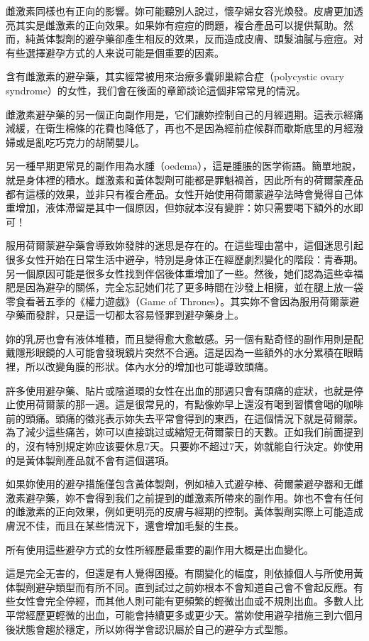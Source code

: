 \documentclass[12pt,UTF8]{ctexbook}
\begin{document}
雌激素同樣也有正向的影響。妳可能聽別人說过，懷孕婦女容光煥發。皮膚更加透亮其实是雌激素的正向效果。如果妳有痘痘的問題，複合產品可以提供幫助。然而，純黃体製劑的避孕藥卻產生相反的效果，反而造成皮膚、頭髮油膩与痘痘。对有些選擇避孕方式的人来说可能是個重要的因素。

含有雌激素的避孕藥，其实經常被用來治療多囊卵巢綜合症（polycystic ovary syndrome）的女性，我们會在後面的章節談论這個非常常見的情況。

雌激素避孕藥的另一個正向副作用是，它们讓妳控制自己的月經週期。這表示經痛減緩，在衛生棉條的花費也降低了，再也不是因為經前症候群而歇斯底里的月經潑婦或是亂吃巧克力的胡鬧嬰儿。

另一種早期更常見的副作用為水腫（oedema），這是腫脹的医学術語。簡單地說，就是身体裡的積水。雌激素和黃体製劑可能都是罪魁禍首，因此所有的荷爾蒙產品都有這樣的效果，並非只有複合產品。女性开始使用荷爾蒙避孕法時會覺得自己体重增加，液体滯留是其中一個原因，但妳就本沒有變胖：妳只需要喝下額外的水即可！

服用荷爾蒙避孕藥會導致妳發胖的迷思是存在的。在這些理由當中，這個迷思引起很多女性开始在日常生活中避孕，特別是身体正在經歷劇烈變化的階段：青春期。另一個原因可能是很多女性找到伴侶後体重增加了一些。然後，她们認為這些幸福肥是因為避孕的關係，完全忘記她们花了更多時間在沙發上相擁，並在腿上放一袋零食看著五季的《權力遊戲》（Game of Thrones）。其实妳不會因為服用荷爾蒙避孕藥而發胖，只是這一切都太容易怪罪到避孕藥身上。

妳的乳房也會有液体堆積，而且變得愈大愈敏感。另一個有點奇怪的副作用則是配戴隱形眼鏡的人可能會發現鏡片突然不合適。這是因為一些額外的水分累積在眼睛裡，所以改變角膜的形狀。体內水分的增加也可能導致頭痛。

許多使用避孕藥、貼片或陰道環的女性在出血的那週只會有頭痛的症狀，也就是停止使用荷爾蒙的那一週。這是很常見的，有點像妳早上還沒有喝到習慣會喝的咖啡前的頭痛。頭痛的徵兆表示妳失去平常會得到的東西，在這個情況下就是荷爾蒙。為了減少這些痛苦，妳可以直接跳过或縮短无荷爾蒙日的天數。正如我们前面提到的，沒有特別規定妳应该要休息7天。只要妳不超过7天，妳就能自行決定。妳使用的是黃体製劑產品就不會有這個選項。

如果妳使用的避孕措施僅包含黃体製劑，例如植入式避孕棒、荷爾蒙避孕器和无雌激素避孕藥，妳不會得到我们之前提到的雌激素所帶來的副作用。妳也不會有任何的雌激素的正向效果，例如更明亮的皮膚与經期的控制。黃体製劑实際上可能造成膚況不佳，而且在某些情況下，還會增加毛髮的生長。

所有使用這些避孕方式的女性所經歷最重要的副作用大概是出血變化。

這是完全无害的，但還是有人覺得困擾。有關變化的幅度，則依據個人与所使用黃体製劑避孕類型而有所不同。直到試过之前妳根本不會知道自己會不會起反應。有些女性會完全停經，而其他人則可能有更頻繁的輕微出血或不規則出血。多數人比平常經歷更輕微的出血，可能會持續更多或更少天。當妳使用避孕措施三到六個月後狀態會趨於穩定，所以妳得学會認识屬於自己的避孕方式型態。
\end{document}
